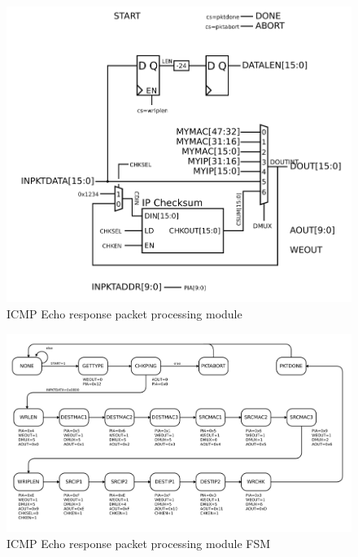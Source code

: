 \begin{figure}
\begin{centering}
\includegraphics[scale=0.8]{ping.ip.svg}
\end{centering}
\caption{ICMP Echo response packet processing module}
\label{ping.ip}
\end{figure}

\begin{figure}
\begin{centering}
\includegraphics[scale=0.8]{ping.ip.fsm.svg}
\end{centering}
\caption{ICMP Echo response packet processing module FSM}
\label{ping.ip.fsm}
\end{figure}


